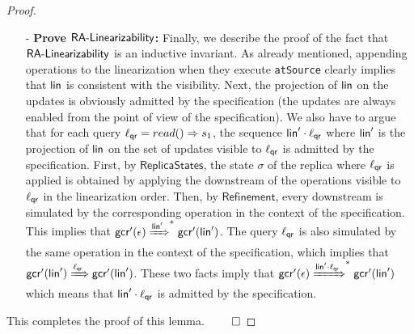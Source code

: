 {\begin {proof}
\begin{itemize}
\item[-] {\bf Prove $\mathsf{\CRDTLinshort{}}$:} Finally, we describe the proof of the fact that $\mathsf{\CRDTLinshort{}}$ is an inductive invariant. As already mentioned, appending operations to the linearization when they execute \lstinline|atSource| clearly implies that $\alinord$ is consistent with the visibility. Next, the projection of $\alinord$ on the updates is obviously admitted by the specification (the updates are always enabled from the point of view of the specification).
We also have to argue that for each query $\alabel_{\mathsf{qr}} = \alabellongind[read]{}{s_1}{}$, the sequence $\alinord'\cdot \alabel_{\mathsf{qr}}$ where $\alinord'$ is the projection of $\alinord$ on the set of updates
visible to $\alabel_{\mathsf{qr}}$ is admitted by the specification. First, by $\mathsf{ReplicaStates}$, the state $\sigma$ of the replica where $\alabel_{\mathsf{qr}}$ is applied is obtained by applying the downstream of the operations visible to $\alabel_{\mathsf{qr}}$ in the linearization order. Then, by $\mathsf{Refinement}$, every downstream is simulated by the corresponding operation in the context of the specification. This implies that $\gconfres'(\epsilon)\xRightarrow{\alinord'}^*\gconfres'(\alinord')$. The query $\alabel_{\mathsf{qr}}$ is also simulated by the same operation in the context of the specification, which implies that $\gconfres'(\alinord')\xRightarrow{\alabel_{\mathsf{qr}}}\gconfres'(\alinord')$. These two facts imply that $\gconfres'(\epsilon)\xRightarrow{\alinord'\cdot \alabel_{\mathsf{qr}}}^*\gconfres'(\alinord')$ which means that $\alinord'\cdot \alabel_{\mathsf{qr}}$ is admitted by the specification.
\end{itemize}

This completes the proof of this lemma. $\qed$
\end {proof}
}































